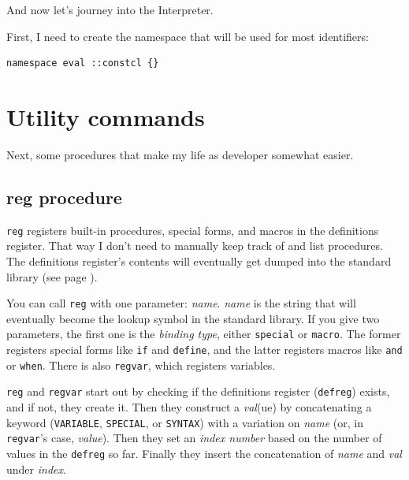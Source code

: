 \documentclass[twoside,9pt]{report}
\begin{document}
And now let's journey into the Interpreter.


First, I need to create the namespace that will be used for most identifiers:

\begin{lstlisting}
namespace eval ::constcl {}
\end{lstlisting}
\section{Utility commands}
\label{utility-commands}


Next, some procedures that make my life as developer somewhat easier.

\subsection{reg procedure}
\label{reg-procedure}


\texttt{reg} registers built-in procedures, special forms, and macros in the definitions register. That way I don't need to manually keep track of and list procedures. The definitions register's contents will eventually get dumped into the standard library (see page \pageref{environment-startup}).


You can call \texttt{reg} with one parameter: \emph{name}. \emph{name} is the string that will eventually become the lookup symbol in the standard library. If you give two parameters, the first one is the \emph{binding type}, either \texttt{special} or \texttt{macro}. The former registers special forms like \texttt{if} and \texttt{define}, and the latter registers macros like \texttt{and} or \texttt{when}. There is also \texttt{regvar}, which registers variables.


\texttt{reg} and \texttt{regvar} start out by checking if the definitions register (\texttt{defreg}) exists, and if not, they create it. Then they construct a \emph{val}(ue) by concatenating a keyword (\texttt{VARIABLE}, \texttt{SPECIAL}, or \texttt{SYNTAX}) with a variation on \emph{name} (or, in \texttt{regvar}'s case, \emph{value}). Then they set an \emph{index number} based on the number of values in the \texttt{defreg} so far. Finally they insert the concatenation of \emph{name} and \emph{val} under \emph{index}.
\end{document}
